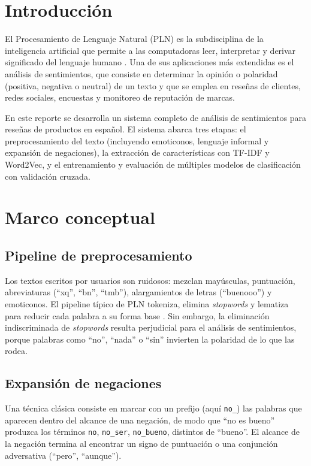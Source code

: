 \documentclass[11pt,letterpaper]{article}
\begin{document}
\portada
\indicegeneral

\section{Introducción}

El Procesamiento de Lenguaje Natural (PLN) es la subdisciplina de la inteligencia artificial que permite a las computadoras leer, interpretar y derivar significado del lenguaje humano \parencite{jurafsky2021, iae_u4_t41}. Una de sus aplicaciones más extendidas es el análisis de sentimientos, que consiste en determinar la opinión o polaridad (positiva, negativa o neutral) de un texto y que se emplea en reseñas de clientes, redes sociales, encuestas y monitoreo de reputación de marcas.

En este reporte se desarrolla un sistema completo de análisis de sentimientos para reseñas de productos en español. El sistema abarca tres etapas: el preprocesamiento del texto (incluyendo emoticonos, lenguaje informal y expansión de negaciones), la extracción de características con TF-IDF y Word2Vec, y el entrenamiento y evaluación de múltiples modelos de clasificación con validación cruzada.

\section{Marco conceptual}

\subsection{Pipeline de preprocesamiento}

Los textos escritos por usuarios son ruidosos: mezclan mayúsculas, puntuación, abreviaturas (``xq'', ``bn'', ``tmb''), alargamientos de letras (``buenooo'') y emoticonos. El pipeline típico de PLN tokeniza, elimina \textit{stopwords} y lematiza para reducir cada palabra a su forma base \parencite{bird2022, iae_u4_t41}. Sin embargo, la eliminación indiscriminada de \textit{stopwords} resulta perjudicial para el análisis de sentimientos, porque palabras como ``no'', ``nada'' o ``sin'' invierten la polaridad de lo que las rodea.

\subsection{Expansión de negaciones}

Una técnica clásica consiste en marcar con un prefijo (aquí \texttt{no\_}) las palabras que aparecen dentro del alcance de una negación, de modo que ``no es bueno'' produzca los términos \texttt{no}, \texttt{no\_ser}, \texttt{no\_bueno}, distintos de ``bueno''. El alcance de la negación termina al encontrar un signo de puntuación o una conjunción adversativa (``pero'', ``aunque'').
\end{document}
